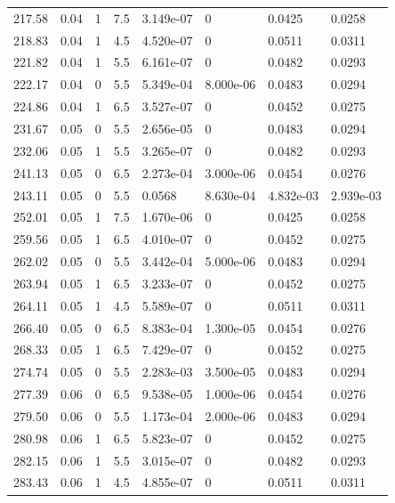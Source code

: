 \documentclass[preview]{standalone}
\begin{document}
{{{\begin{tabular}{L{1.2cm}C{1.2cm} C{0.3cm}C{0.5cm} C{1.4cm}C{1.4cm} C{1.4cm}C{1.4cm}}
  217.58  &  0.04  & 1     & 7.5 &  3.149e-07  & 0  & 0.0425 &  0.0258   \\ 
  218.83  &  0.04  & 1     & 4.5 &  4.520e-07  & 0  & 0.0511 &  0.0311   \\ 
  221.82  &  0.04  & 1     & 5.5 &  6.161e-07  & 0  & 0.0482 &  0.0293   \\ 
  222.17  &  0.04  & 0     & 5.5 &  5.349e-04  & 8.000e-06  & 0.0483 &  0.0294   \\ 
  224.86  &  0.04  & 1     & 6.5 &  3.527e-07  & 0  & 0.0452 &  0.0275   \\ 
  231.67  &  0.05  & 0     & 5.5 &  2.656e-05  & 0  & 0.0483 &  0.0294   \\ 
  232.06  &  0.05  & 1     & 5.5 &  3.265e-07  & 0  & 0.0482 &  0.0293   \\ 
  241.13  &  0.05  & 0     & 6.5 &  2.273e-04  & 3.000e-06  & 0.0454 &  0.0276   \\ 
  243.11  &  0.05  & 0     & 5.5 &  0.0568  & 8.630e-04  & 4.832e-03 &  2.939e-03   \\ 
  252.01  &  0.05  & 1     & 7.5 &  1.670e-06  & 0  & 0.0425 &  0.0258   \\ 
  259.56  &  0.05  & 1     & 6.5 &  4.010e-07  & 0  & 0.0452 &  0.0275   \\ 
  262.02  &  0.05  & 0     & 5.5 &  3.442e-04  & 5.000e-06  & 0.0483 &  0.0294   \\ 
  263.94  &  0.05  & 1     & 6.5 &  3.233e-07  & 0  & 0.0452 &  0.0275   \\ 
  264.11  &  0.05  & 1     & 4.5 &  5.589e-07  & 0  & 0.0511 &  0.0311   \\ 
  266.40  &  0.05  & 0     & 6.5 &  8.383e-04  & 1.300e-05  & 0.0454 &  0.0276   \\ 
  268.33  &  0.05  & 1     & 6.5 &  7.429e-07  & 0  & 0.0452 &  0.0275   \\ 
  274.74  &  0.05  & 0     & 5.5 &  2.283e-03  & 3.500e-05  & 0.0483 &  0.0294   \\ 
  277.39  &  0.06  & 0     & 6.5 &  9.538e-05  & 1.000e-06  & 0.0454 &  0.0276   \\ 
  279.50  &  0.06  & 0     & 5.5 &  1.173e-04  & 2.000e-06  & 0.0483 &  0.0294   \\ 
  280.98  &  0.06  & 1     & 6.5 &  5.823e-07  & 0  & 0.0452 &  0.0275   \\ 
  282.15  &  0.06  & 1     & 5.5 &  3.015e-07  & 0  & 0.0482 &  0.0293   \\ 
  283.43  &  0.06  & 1     & 4.5 &  4.855e-07  & 0  & 0.0511 &  0.0311   \\ 

\end{tabular}}}}
\end{document}
